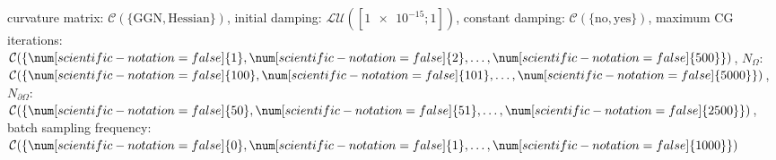 curvature matrix: $\mathcal{C}(\{\text{GGN},\text{Hessian}\})$, initial damping: $\mathcal{LU}([\num[scientific-notation=true]{1e-15}; \num[scientific-notation=false]{1}])$, constant damping: $\mathcal{C}(\{\text{no},\text{yes}\})$, maximum CG iterations: $\mathcal{C}(\{\num[scientific-notation=false]{1},\num[scientific-notation=false]{2},\text{\dots},\num[scientific-notation=false]{500}\})$, $N_{\Omega}$: $\mathcal{C}(\{\num[scientific-notation=false]{100},\num[scientific-notation=false]{101},\text{\dots},\num[scientific-notation=false]{5000}\})$, $N_{\partial\Omega}$: $\mathcal{C}(\{\num[scientific-notation=false]{50},\num[scientific-notation=false]{51},\text{\dots},\num[scientific-notation=false]{2500}\})$, batch sampling frequency: $\mathcal{C}(\{\num[scientific-notation=false]{0},\num[scientific-notation=false]{1},\text{\dots},\num[scientific-notation=false]{1000}\})$